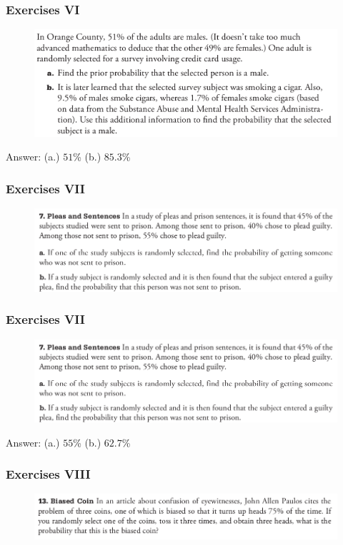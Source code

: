 \documentclass[xcolor=dvipsnames]{beamer}
\begin{document}
\begin{frame}
  \frametitle{Exercises VI}
\begin{figure}[h]
\includegraphics[scale=.32]{./diagrams/triola_bayes1.png}
\end{figure}
Answer: (a.) $51$\% (b.) $85.3$\%
\end{frame}

\begin{frame}
  \frametitle{Exercises VII}
\begin{figure}[h]
\includegraphics[scale=.36]{./diagrams/triola_bayes2.png}
\end{figure}
\end{frame}

\begin{frame}
  \frametitle{Exercises VII}
\begin{figure}[h]
\includegraphics[scale=.36]{./diagrams/triola_bayes2.png}
\end{figure}
Answer: (a.) $55$\% (b.) $62.7$\%
\end{frame}

\begin{frame}
  \frametitle{Exercises VIII}
\begin{figure}[h]
\includegraphics[scale=.36]{./diagrams/triola_bayes3.png}
\end{figure}
\end{frame}
\end{document}
